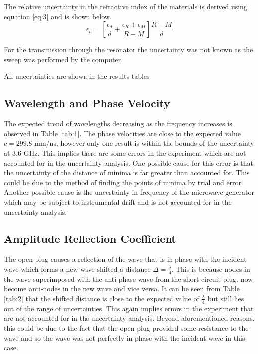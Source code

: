 \documentclass[12pt]{article}
\begin{document}
The relative uncertainty in the refractive index of the materials is derived using equation \ref{eq:3} and is shown below.
\begin{equation}
    \epsilon_{n} =\left[ \frac{\epsilon_{d}}{d}+\frac{\epsilon_{R} + \epsilon_{M}}{R-M} \right] \frac{R-M}{d}
    \label{eq:8}
\end{equation}

For the transmission through the resonator the uncertainty was not known as the sweep was performed by the computer. 

All uncertainties are shown in the results tables

\subsection{Wavelength and Phase Velocity}
The expected trend of wavelengths decreasing as the frequency increases is observed in Table \ref{tab:1}.
The phase velocities are close to the expected value $c = 299.8$ mm/ns, however only one result is within the bounds of the uncertainty at 3.6 GHz.
This implies there are some errors in the experiment which are not accounted for in the uncertainty analysis.
One possible cause for this error is that the uncertainty of the distance of minima is far greater than accounted for.
This could be due to the method of finding the points of minima by trial and error.
Another possible cause is the uncertainty in frequency of the microwave generator which may be subject to instrumental drift and is not accounted for in the uncertainty analysis.

\subsection{Amplitude Reflection Coefficient}
The open plug causes a reflection of the wave that is in phase with the incident wave which forms a new wave
shifted a distance $\Delta = \frac{\lambda}{4}$. This is because nodes in the wave superimposed with the anti-phase wave from the short circuit plug.
now become anti-nodes in the new wave and vice versa. It can be seen from Table \ref{tab:2} that the shifted distance is close to the expected value of $\frac{\lambda}{4}$
but still lies out of the range of uncertainties. This again implies errors in the experiment that are not accounted for in the uncertainty analysis.
Beyond aforementioned reasons, this could be due to the fact that the open plug provided some resistance to the wave and so the wave was not perfectly in phase with the incident wave in this case.
\end{document}
